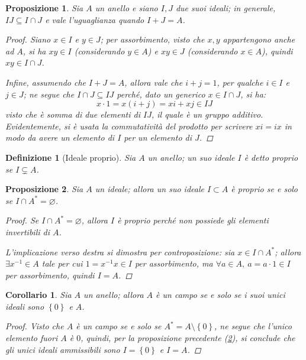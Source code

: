 \documentclass[12pt]{scrartcl}
\theoremstyle{style}
\newtheorem{definizione}{Definizione}[section]
\newtheorem{prop}{Proposizione}[section]
\newtheorem{corollario}{Corollario}[teorema]
\numberwithin{equation}{subsection}
\begin{document}
\begin{prop}
	Sia $A$ un anello e siano $I,J$ due suoi ideali; in generale, $IJ\subseteq  I\cap J$ e vale l'uguaglianza quando $I+J = A$.
	\begin{proof}
		Siano $x \in I$ e $y \in J$; per assorbimento, visto che $x,y$ appartengono anche ad $A$, si ha $xy \in I$ (considerando $y \in A$) e $xy \in J$ (considerando $x \in A$), quindi $xy \in I\cap J$.

		Infine, assumendo che $I + J = A$, allora vale che $i + j = 1$, per qualche $i \in I$ e $j \in J$; ne segue che $I\cap J \subseteq IJ$ perch\'e, dato un generico $x \in I\cap J$, si ha:
		\[
		x \cdot 1 = x (i + j) = xi  + xj \in IJ
		\] 
		visto che \`e somma di due elementi di $IJ$, il quale \`e un gruppo additivo. 
		Evidentemente, si \`e usata la commutativit\`a del prodotto per scrivere $x i = i x$ in modo da avere un elemento di $I$ per un elemento di $J$.
	\end{proof}
\end{prop}
\begin{definizione}
	[Ideale proprio]
	Sia $A$ un anello; un suo ideale $I$ \`e detto \textit{proprio} se $I \subsetneq A$.
\end{definizione}
\begin{prop}\label{idprop}
	Sia $A$ un ideale; allora un suo ideale $I \subset A$ \`e proprio se e solo se $I \cap A^* = \varnothing$.
	\begin{proof}
		Se $I\cap A^* = \varnothing$, allora $I$ \`e proprio perch\'e non possiede gli elementi invertibili di $A$.

		L'implicazione verso destra si dimostra per controposizione: sia $x \in I\cap A^*$; allora $\exists x^{-1}\in A$ tale per cui $1=x^{-1}x \in I$ per assorbimento, ma $\forall a \in A, \ a = a \cdot 1 \in I$ per assorbimento, quindi $I=A$.
	\end{proof}
\end{prop}
\begin{corollario}
	Sia $A$ un anello; allora $A$ \`e un campo se e solo se i suoi unici ideali sono $\left\{ 0 \right\} $ e $A$.
	\begin{proof}
		Visto che $A$ \`e un campo se e solo se $A^* = A \setminus\left\{ 0 \right\} $, ne segue che l'unico elemento fuori $A$ \`e $0$, quindi, per la proposizione precedente (\ref{idprop}), si conclude che gli unici ideali ammissibili sono $I=\left\{ 0 \right\} $ e $I=A$.
	\end{proof}
\end{corollario}
\end{document}
